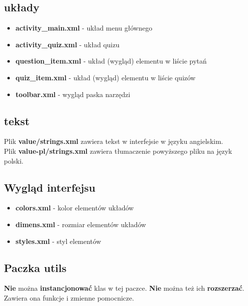 \documentclass[12pt, a4paper]{article}
\begin{document}
\subsection{układy}
\begin{itemize}
\item \textbf{activity\_main.xml} - układ menu głównego
\item \textbf{activity\_quiz.xml} - układ quizu
\item \textbf{question\_item.xml} - układ (wygląd) elementu w liście pytań
\item \textbf{quiz\_item.xml} - układ (wygląd) elementu w liście quizów
\item \textbf{toolbar.xml} - wygląd paska narzędzi
\end{itemize}

\subsection{tekst}
Plik \textbf{value/strings.xml} zawiera tekst w interfejsie w języku angielskim.\\
Plik \textbf{value-pl/strings.xml} zawiera tłumaczenie powyższego pliku na język polski.

\subsection{Wygląd interfejsu}
\begin{itemize}
\item \textbf{colors.xml} - kolor elementów układów
\item \textbf{dimens.xml} - rozmiar elementów układów
\item \textbf{styles.xml} - styl elementów
\end{itemize}

\subsection{Paczka utils}
\textbf{Nie} można \textbf{instancjonować} klas w tej paczce. \textbf{Nie} można też ich \textbf{rozszerzać}. Zawiera ona funkcje i zmienne pomocnicze.
\end{document}
